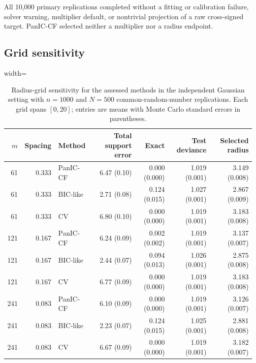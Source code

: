 \documentclass[12pt]{article}
\newenvironment{bluechange}{\begingroup\color[rgb]{0.00,0.00,1.00}}{\endgroup}
\theoremstyle{remark}
\theoremstyle{plain}
\begin{document}
\begin{bluechange}
All 10,000 primary replications completed without a fitting or calibration failure, solver warning, multiplier default, or nontrivial projection of a raw cross-signed target. PanIC-CF selected neither a multiplier nor a radius endpoint.



\subsection{Grid sensitivity}
\begin{table}[H]
\centering
\caption{Radius-grid sensitivity for the assessed methods in the independent Gaussian setting with $n=1000$ and $N=500$ common-random-number replications. Each grid spans $[0,20]$; entries are means with Monte Carlo standard errors in parentheses.}
\label{Table: grid sensitivity}
\begin{adjustbox}{width=\textwidth}
\scriptsize
\begin{tabular}{rrlrrrr}
\hline
$m$ & Spacing & Method & Total support error & Exact & Test deviance & Selected radius \\
\hline
61 & 0.333 & PanIC-CF & 6.47 (0.10) & 0.000 (0.000) & 1.019 (0.001) & 3.149 (0.008) \\
61 & 0.333 & BIC-like & 2.71 (0.08) & 0.124 (0.015) & 1.027 (0.001) & 2.867 (0.009) \\
61 & 0.333 & CV & 6.80 (0.10) & 0.000 (0.000) & 1.019 (0.001) & 3.183 (0.008) \\
121 & 0.167 & PanIC-CF & 6.24 (0.09) & 0.002 (0.002) & 1.019 (0.001) & 3.137 (0.007) \\
121 & 0.167 & BIC-like & 2.44 (0.07) & 0.094 (0.013) & 1.026 (0.001) & 2.875 (0.008) \\
121 & 0.167 & CV & 6.77 (0.09) & 0.000 (0.000) & 1.019 (0.001) & 3.183 (0.008) \\
241 & 0.083 & PanIC-CF & 6.10 (0.09) & 0.000 (0.000) & 1.019 (0.001) & 3.126 (0.007) \\
241 & 0.083 & BIC-like & 2.23 (0.07) & 0.124 (0.015) & 1.025 (0.001) & 2.881 (0.008) \\
241 & 0.083 & CV & 6.67 (0.09) & 0.000 (0.000) & 1.019 (0.001) & 3.182 (0.007) \\
\hline
\end{tabular}
\end{adjustbox}
\end{table}



\end{bluechange}
\end{document}
